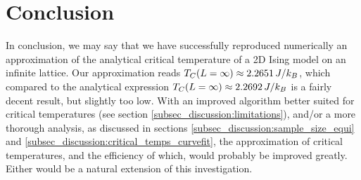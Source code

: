\section{Conclusion}\label{sec:conclusion}

In conclusion, we may say that we have successfully reproduced numerically an approximation of the analytical critical temperature of a 2D Ising model on an infinite lattice. Our approximation reads $T_C(L=\infty) \approx 2.2651\,J/k_B$, which compared to the analytical expression $T_C(L=\infty)\approx 2.2692\,J/k_B$ is a fairly decent result, but slightly too low. With an improved algorithm better suited for critical temperatures (see section \ref{subsec_discussion:limitations}), and/or a more thorough analysis, as discussed in sections \ref{subsec_discussion:sample_size_equi} and \ref{subsec_discussion:critical_temps_curvefit}, the approximation of critical temperatures, and the efficiency of which, would probably be improved greatly. Either would be a natural extension of this investigation. 

